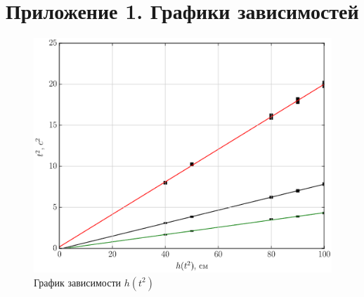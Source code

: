 \documentclass[a4paper,12pt]{report}
\begin{document}
\newpage
\section*{Приложение 1. Графики зависимостей} %
\label{sec:figures}

\begin{figure}[h]
\begin{center}
\includegraphics*[width=1\textwidth]{img/ex1.eps}
\caption{\label{fig:htt}График зависимости $h(t^2)$}
\end{center}
\end{figure}
\end{document}
